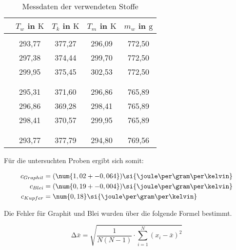 \begin{table}
 \centering
 \label{tab:Messdaten1}
 \begin{tabular}[width=0.4\textwidth]{S S[table-format=3.2] S[table-format=3.2]
   S[table-format=3.2] S[table-format=3.2]}
     \toprule
     {}  & {$T_w$ in $\si{\kelvin}$} & {$T_k$ in $\si{\kelvin}$} &
     {$T_m$ in $\si{\kelvin}$} & {$m_w$ in $\si{\gram}$} \\
     \midrule
      & & & & \\
      & 293,77 & 377,27 & 296,09 & 772,50 \\
      & 297,38 & 374,44 & 299,70 & 772,50 \\
      & 299,95 & 375,45 & 302,53 & 772,50 \\
     & & & & \\
      & & & & \\
      & 295,31 & 371,60 & 296,86 & 765,89 \\
      & 296,86 & 369,28 & 298,41 & 765,89 \\
      & 298,41 & 370,57 & 299,95 & 765,89 \\
     & & & & \\
      & & & & \\
      & 293,77 & 377,79 & 294,80 & 769,56 \\
     \bottomrule
\end{tabular}
  \caption{Messdaten der verwendeten Stoffe}
\end{table}
\FloatBarrier

Für die untersuchten Proben ergibt sich somit:

\begin{align*}
  c_{Graphit} &= (\num{1,02 +- 0,064})\si{\joule\per\gram\per\kelvin} \\
  c_{Blei} &= (\num{0,19 +- 0,004})\si{\joule\per\gram\per\kelvin} \\
  c_{Kupfer} &= \num{0,18}\si{\joule\per\gram\per\kelvin} \\
\end{align*}

Die Fehler für Graphit und Blei wurden über die folgende Formel bestimmt.

\begin{equation}
  \label{eqn:Fehler}
  \increment\bar{x} = \sqrt{\frac{1}{N(N - 1)}
  \cdot\sum_{i = 1}^N(x_i-\bar{x})^2}
\end{equation}

